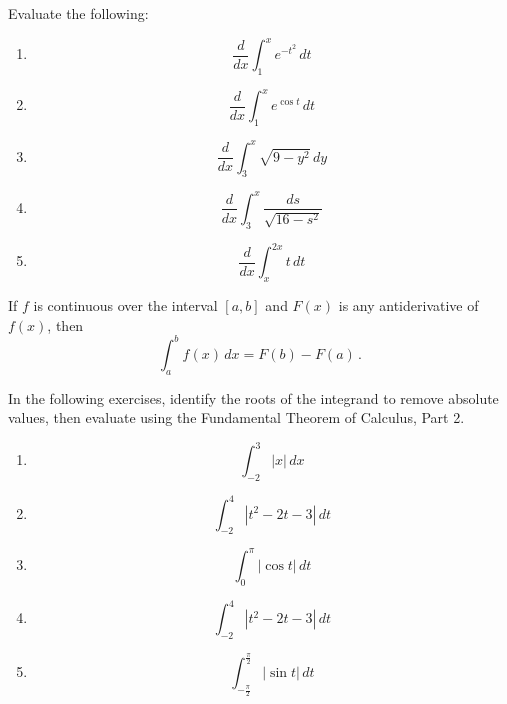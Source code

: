 \documentclass[12pt]{amsart}
\begin{document}
\begin{problem}
Evaluate the following:
\begin{enumerate}
	\item
	      \[
		      \frac{d}{dx} \int_1^x e^{-t^2} \, dt
	      \]
	      \vspace{5cm}

	\item
	      \[
		      \frac{d}{dx} \int_1^x e^{\cos t} \, dt
	      \]
	      \vspace{5cm}

	\item
	      \[
		      \frac{d}{dx} \int_3^x \sqrt{9 - y^2} \, dy
	      \]
	      \vspace{5cm}

	\item
	      \[
		      \frac{d}{dx} \int_3^x \frac{ds}{\sqrt{16 - s^2}}
	      \]
	      \vspace{5cm}

	\item
	      \[
		      \frac{d}{dx} \int_x^{2x} t \, dt
	      \]
	      \vspace{5cm}
\end{enumerate}


\end{problem}

\begin{theorem}
	If $f$ is continuous over the interval $[a,b]$ and
	$F(x)$ is any antiderivative of $f(x)$, then
	\begin{equation*}
		\int_a^b f(x) \, dx = F(b) - F(a) \,.
	\end{equation*}

\end{theorem}

\begin{problem}
In the following exercises, identify the roots of the integrand to remove absolute values, then evaluate using the Fundamental Theorem of Calculus, Part 2.

\begin{enumerate}
	\item \[ \int_{-2}^{3} |x| \, dx \]
	      \vspace{5cm}
	\item \[ \int_{-2}^{4} |t^2 - 2t - 3| \, dt \]
	      \vspace{5cm}
	\item \[ \int_{0}^{\pi} |\cos t| \, dt \]
	      \vspace{5cm}
	\item \[ \int_{-2}^{4} |t^2 - 2t - 3| \, dt \]
	      \vspace{5cm}
	\item \[ \int_{-\frac{\pi}{2}}^{\frac{\pi}{2}} |\sin t| \, dt \]
	      \vspace{5cm}
\end{enumerate}
\end{problem}
\end{document}
